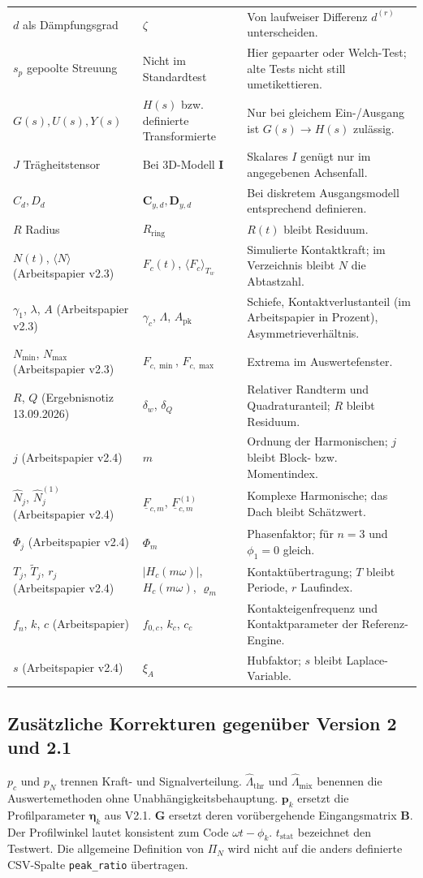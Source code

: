 \documentclass[11pt,a4paper]{article}
\begin{document}
\begin{longtable}{@{}L{.27\textwidth}L{.28\textwidth}L{.40\textwidth}@{}}
$d$ als Dämpfungsgrad&$\zeta$&Von laufweiser Differenz $d^{(r)}$ unterscheiden.\\
$s_p$ gepoolte Streuung&Nicht im Standardtest&Hier gepaarter oder Welch-Test; alte Tests nicht still umetikettieren.\\
$G(s),U(s),Y(s)$&$H(s)$ bzw. definierte Transformierte&Nur bei gleichem Ein-/Ausgang ist $G(s)\to H(s)$ zulässig.\\
$J$ Trägheitstensor&Bei 3D-Modell $\mathbf I$&Skalares $I$ genügt nur im angegebenen Achsenfall.\\
$C_d,D_d$&$\mathbf C_{y,d},\mathbf D_{y,d}$&Bei diskretem Ausgangsmodell entsprechend definieren.\\
$R$ Radius&$R_{\mathrm{ring}}$&$R(t)$ bleibt Residuum.\\
$N(t)$, $\langle N\rangle$ (Arbeitspapier v2.3)&$F_c(t)$, $\langle F_c\rangle_{T_w}$&Simulierte Kontaktkraft; im Verzeichnis bleibt $N$ die Abtastzahl.\\
$\gamma_1$, $\lambda$, $A$ (Arbeitspapier v2.3)&$\gamma_c$, $\Lambda$, $A_{\mathrm{pk}}$&Schiefe, Kontaktverlustanteil (im Arbeitspapier in Prozent), Asymmetrieverhältnis.\\
$N_{\min}$, $N_{\max}$ (Arbeitspapier v2.3)&$F_{c,\min}$, $F_{c,\max}$&Extrema im Auswertefenster.\\
$R$, $Q$ (Ergebnisnotiz 13.09.2026)&$\delta_w$, $\delta_Q$&Relativer Randterm und Quadraturanteil; $R$ bleibt Residuum.\\
$j$ (Arbeitspapier v2.4)&$m$&Ordnung der Harmonischen; $j$ bleibt Block- bzw. Momentindex.\\
$\hat N_j$, $\hat N_j^{(1)}$ (Arbeitspapier v2.4)&$\underline{F}_{c,m}$, $\underline{F}^{(1)}_{c,m}$&Komplexe Harmonische; das Dach bleibt Schätzwert.\\
$\Phi_j$ (Arbeitspapier v2.4)&$\Phi_m$&Phasenfaktor; für $n=3$ und $\phi_1=0$ gleich.\\
$T_j$, $\tilde T_j$, $r_j$ (Arbeitspapier v2.4)&$|H_c(m\omega)|$, $H_c(m\omega)$, $\varrho_m$&Kontaktübertragung; $T$ bleibt Periode, $r$ Laufindex.\\
$f_n$, $k$, $c$ (Arbeitspapier)&$f_{0,c}$, $k_c$, $c_c$&Kontakteigenfrequenz und Kontaktparameter der Referenz-Engine.\\
$s$ (Arbeitspapier v2.4)&$\xi_A$&Hubfaktor; $s$ bleibt Laplace-Variable.\\
\bottomrule\end{longtable}
\subsection{Zusätzliche Korrekturen gegenüber Version 2 und 2.1}
$p_c$ und $p_N$ trennen Kraft- und Signalverteilung. $\hat\Lambda_{\mathrm{thr}}$ und $\hat\Lambda_{\mathrm{mix}}$ benennen die Auswertemethoden ohne Unabhängigkeitsbehauptung. $\mathbf p_k$ ersetzt die Profilparameter $\boldsymbol\eta_k$ aus V2.1. $\mathbf G$ ersetzt deren vorübergehende Eingangsmatrix $\mathbf B$. Der Profilwinkel lautet konsistent zum Code $\omega t-\phi_k$. $t_{\mathrm{stat}}$ bezeichnet den Testwert. Die allgemeine Definition von $\Pi_N$ wird nicht auf die anders definierte CSV-Spalte \texttt{peak\_ratio} übertragen.
\end{document}
